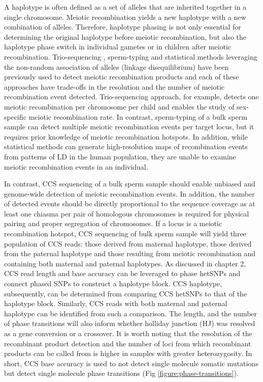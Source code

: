 A haplotype is often defined as a set of alleles that are inherited together in a single chromosome. Meiotic recombination yields a new haplotype with a new combination of alleles. Therefore, haplotype phasing is not only essential for determining the original haplotype before meiotic recombination, but also the haplotype phase switch in individual gametes or in children after meiotic recombination. Trio-sequencing \cite{Kong2010-uk}, sperm-typing \cite{Webb2008-pw} and statistical methods leveraging the non-random association of alleles (linkage disequilibrium) \cite{Myers2005-ml} have been previously used to detect meiotic recombination products and each of these approaches have trade-offs in the resolution and the number of meiotic recombination event detected. Trio-sequencing approach, for example, detects one meiotic recombination per chromosome per child and enables the study of sex-specific meiotic recombination rate. In contrast, sperm-typing of a bulk sperm sample can detect multiple meiotic recombination events per target locus, but it requires prior knowledge of meiotic recombination hotspots. In addition, while statistical methods can generate high-resolution maps of recombination events from patterns of LD in the human population, they are unable to examine meiotic recombination events in an individual.

In contrast, CCS sequencing of a bulk sperm sample should enable unbiased and genome-wide detection of meiotic recombination events. In addition, the number of detected events should be directly proportional to the sequence coverage as at least one chiasma per pair of homologous chromosomes is required for physical pairing and proper segregation of chromosomes. If a locus is a meiotic recombination hotspot, CCS sequencing of bulk sperm sample will yield three population of CCS reads: those derived from maternal haplotype, those derived from the paternal haplotype and those resulting from meiotic recombination and containing both maternal and paternal haplotypes. As discussed in chapter 2, CCS read length and base accuracy can be leveraged to phase hetSNPs and connect phased SNPs to construct a haplotype block. CCS haplotype, subsequently, can be determined from comparing CCS hetSNPs to that of the haplotype block. Similarly, CCS reads with both maternal and paternal haplotype can be identified from such a comparison. The length, and the number of phase transitions will also inform whether holliday junction (HJ) was resolved as a gene conversion or a crossover. It is worth noting that the resolution of the recombinant product detection and the number of loci from which recombinant products can be called from is higher in samples with greater heterozygosity. In short, CCS base accuracy is used to not detect single molecule somatic mutations but detect single molecule phase transitions (Fig \ref{figure:phase-transitions}).

